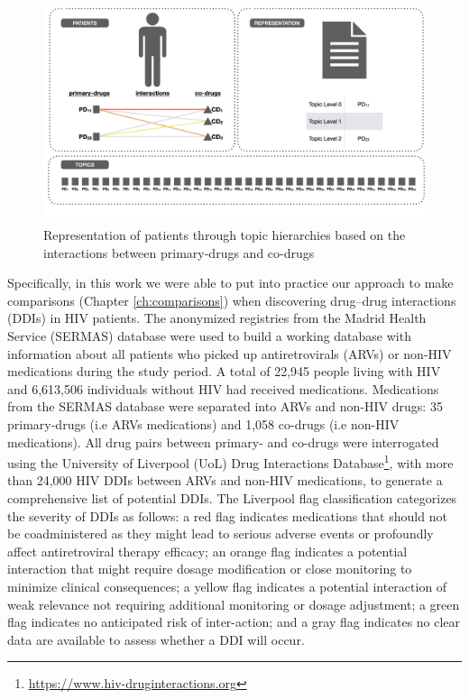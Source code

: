 \begin{figure}[ht]
    \centering
    \includegraphics[width=0.8\linewidth]{polypharmacy.png}
    \caption{Representation of patients through topic hierarchies based on the interactions between primary-drugs and co-drugs}
    \label{fig:polypharmacy-topics}
\end{figure}

Specifically, in this work we were able to put into practice our approach to make comparisons (Chapter \ref{ch:comparisons}) when discovering drug–drug interactions (DDIs) in HIV patients. The anonymized registries from the Madrid Health Service (SERMAS) database were used to build a working database with information about all patients who picked up antiretrovirals (ARVs) or non-HIV medications during the study period. A total of 22,945 people living with HIV and 6,613,506 individuals without HIV had received medications. Medications from the SERMAS database were separated into ARVs and non-HIV drugs: 35 primary-drugs (i.e ARVs medications) and 1,058 co-drugs (i.e non-HIV medications). All drug pairs between primary- and co-drugs were interrogated using the University of Liverpool (UoL) Drug Interactions Database\footnote{\url{https://www.hiv-druginteractions.org}}, with more than 24,000 HIV DDIs between ARVs and non-HIV medications, to generate a comprehensive list of potential DDIs. The Liverpool flag classification  categorizes the severity of DDIs as follows: a red flag indicates medications that should not be coadministered as they might lead to serious adverse events or profoundly affect antiretroviral therapy efficacy; an orange flag indicates a potential interaction that might require dosage modification or close monitoring to minimize clinical consequences; a yellow flag indicates a potential interaction of weak relevance not requiring additional monitoring or dosage adjustment; a green flag indicates no anticipated risk of inter-action; and a gray flag indicates no clear data are available to assess whether a DDI will occur.

